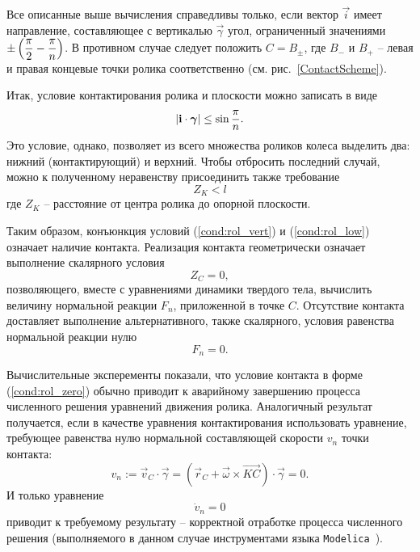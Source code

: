 
Все описанные выше вычисления справедливы только, если вектор $\vec{i}$ имеет направление, составляющее с вертикалью $\vec{\gamma}$ угол, ограниченный значениями $\pm\left(\displaystyle\frac{\displaystyle \pi}{\displaystyle 2} - \displaystyle\frac{\displaystyle \pi}{\displaystyle n}\right)$. В противном случае следует положить $C = B_\pm$, где $B_{-}$ и $B_{+}$ -- левая и правая концевые точки ролика соответственно (см. рис.~\ref{ContactScheme}).

Итак, условие контактирования ролика и плоскости можно записать в виде
\begin{equation}\label{cond:rol_vert}
    \left| \boldsymbol{\mathbf{i}} \cdot \boldsymbol{\mathbf{\gamma}} \right| \le \sin\displaystyle\frac{\displaystyle \pi}{\displaystyle n}.
\end{equation}
Это условие, однако, позволяет из всего множества роликов колеса выделить два: нижний (контактирующий) и верхний. Чтобы отбросить последний случай, можно к полученному неравенству присоединить также требование 
\begin{equation}\label{cond:rol_low}
    Z_K < l
\end{equation}
где $Z_K$ -- расстояние от центра ролика до опорной плоскости.

Таким образом, конъюнкция условий (\ref{cond:rol_vert}) и (\ref{cond:rol_low}) означает наличие контакта. Реализация контакта геометрически означает выполнение скалярного условия
\begin{equation}\label{cond:rol_zero}
    Z_C = 0,
\end{equation}
позволяющего, вместе с уравнениями динамики твердого тела, вычислить величину нормальной реакции $F_n$, приложенной в точке $C$. Отсутствие контакта доставляет выполнение альтернативного, также скалярного, условия равенства нормальной реакции нулю
$$
    F_n = 0.
$$

Вычислительные эксперементы показали, что условие контакта в форме (\ref{cond:rol_zero}) обычно приводит к аварийному завершению процесса численного решения уравнений движения ролика. Аналогичный результат получается, если в качестве уравнения контактирования использовать уравнение, требующее равенства нулю нормальной составляющей скорости $v_n$ точки контакта: 
\begin{equation}\label{eq:cont_vn}
    v_n := \vec{v}_C \cdot \vec{\gamma} = \left(\vec{r}_C + \vec{\omega} \times \overrightarrow{KC}\right) \cdot \vec{\gamma} = 0.
\end{equation}
И только уравнение
\begin{equation}\label{eq:cont_Dvn}
    \dot{v}_n = 0
\end{equation}
приводит к требуемому результату -- корректной отработке процесса численного решения (выполняемого в данном случае инструментами языка \texttt{Modelica}~\cite{Fritzson}).

